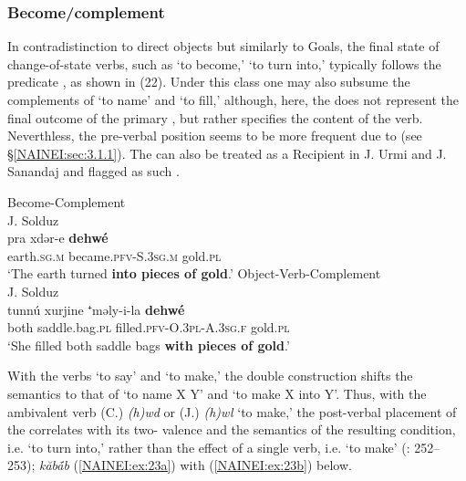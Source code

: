 \documentclass[output=paper,colorlinks,citecolor=brown,draftmode]{langscibook}
\begin{document}
\subsubsection{Become/complement}\label{NAINEI:sec:2.2.3}
In contradistinction to direct objects but similarly to Goals, the final state of change-of-state verbs, such as `to become,' `to turn into,' typically follows the predicate \parencite[e.g.][323]{Khan2008JUrmi}, as shown in (22). Under this class one may also subsume the complements of `to name' and `to fill,' although, here, the   does not represent the final outcome of the primary , but rather specifies the content of the verb. Neverthless, the pre-verbal position seems to be more frequent due to  (see §\ref{NAINEI:sec:3.1.1}). The  can also be treated as a Recipient in J. Urmi and J. Sanandaj and flagged as such \parencite[see][251--252]{NoorlanderMolin2022WordOrder}.

\ea
\ea\label{NAINEI:ex:22a}
Become-Complement\\
J. Solduz \citep[209]{Garbell1065a} \\
\gll pra xdər-e \textbf{dehwé} \\
     earth\textsc{.sg.m} became\textsc{.pfv-S.3sg.m} gold\textsc{.pl} \\
\glt `The earth turned \textbf{into pieces of gold}.'
\ex\label{NAINEI:ex:22b}
Object-Verb-Complement\\
J. Solduz \citep[231]{Garbell1065a} \\
\gll tunnú xurjine ⁺məly-i-la \textbf{dehwé} \\
     both saddle.bag\textsc{.pl} filled\textsc{.pfv-O.3pl-A.3sg.f} gold\textsc{.pl} \\
\glt `She filled both saddle bags \textbf{with pieces of gold}.'
\z
\z

With the verbs `to say' and `to make,' the double  construction shifts the semantics to that of `to name X Y' and `to make X into Y'. Thus, with the ambivalent verb (C.) \textit{(h)wd} or (J.) \textit{(h)wl} `to make,' the post-verbal placement of the  correlates with its two- valence and the semantics of the resulting condition, i.e. `to turn into,' rather than the effect of a single  verb, i.e. `to make' (\citealt{NoorlanderMolin2022WordOrder}: 252–253);  \textit{kăbā́b} (\ref{NAINEI:ex:23a}) with (\ref{NAINEI:ex:23b}) below.
\end{document}

